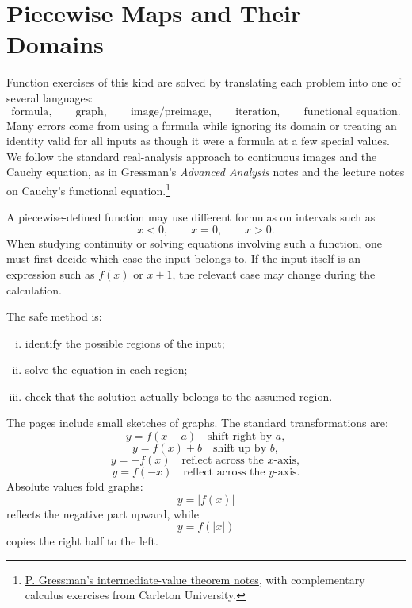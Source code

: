 \enlargethispage{4\baselineskip}

\section{Piecewise Maps and Their Domains}

Function exercises of this kind are solved by translating each problem into one of several languages:
\[
  \text{formula},\qquad \text{graph},\qquad \text{image/preimage},\qquad \text{iteration},\qquad \text{functional equation}.
\]
Many errors come from using a formula while ignoring its domain or treating an identity valid for all inputs as though it were a formula at a few special values. We follow the standard real-analysis approach to continuous images and the Cauchy equation, as in Gressman's \emph{Advanced Analysis} notes and the lecture notes on Cauchy's functional equation.\footnote{\href{https://www2.math.upenn.edu/~gressman/analysis/04-ivt.html}{P. Gressman's intermediate-value theorem notes}, with complementary calculus exercises from Carleton University.}

A piecewise-defined function may use different formulas on intervals such as
\[
  x<0,\qquad x=0,\qquad x>0.
\]
When studying continuity or solving equations involving such a function, one must first decide which case the input belongs to.  If the input itself is an expression such as $f(x)$ or $x+1$, the relevant case may change during the calculation.

The safe method is:
\begin{enumerate}[(i)]
  \item identify the possible regions of the input;
  \item solve the equation in each region;
  \item check that the solution actually belongs to the assumed region.

\end{enumerate}

The pages include small sketches of graphs.  The standard transformations are:
\[
  y=f(x-a) \quad \text{shift right by }a,
\]
\[
  y=f(x)+b \quad \text{shift up by }b,
\]
\[
  y=-f(x) \quad \text{reflect across the }x\text{-axis},
\]
\[
  y=f(-x) \quad \text{reflect across the }y\text{-axis}.
\]
Absolute values fold graphs:
\[
  y=|f(x)|
\]
reflects the negative part upward, while
\[
  y=f(|x|)
\]
copies the right half to the left.

